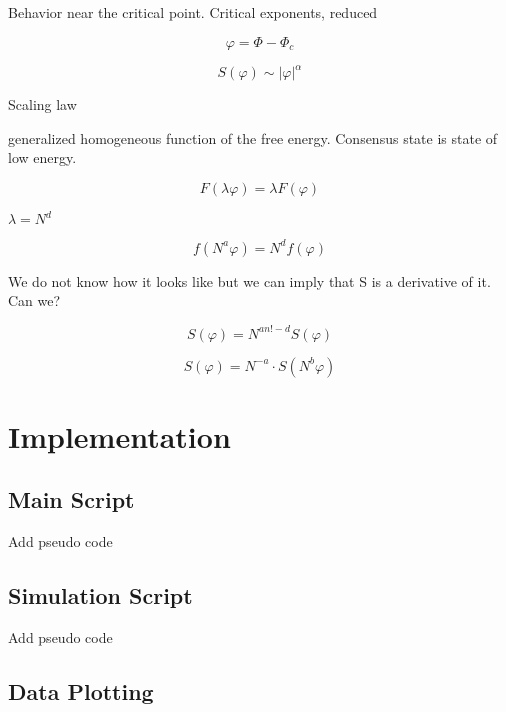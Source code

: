 \documentclass[11pt]{article}
\begin{document}
Behavior near the critical point. Critical exponents, reduced

\begin{equation}
\varphi = \Phi - \Phi_c
\end{equation}

\begin{equation}
S(\varphi) \sim  |\varphi|^\alpha
\end{equation}

Scaling law

generalized homogeneous function of the free energy. Consensus state is state of low energy.

\begin{equation}
F(\lambda \varphi) = \lambda F(\varphi)
\end{equation}

$\lambda = N^d$

\begin{equation}
f(N^a \varphi) = N^d f(\varphi)
\end{equation}

We do not know how it looks like but we can imply that S is a derivative of it. Can we?

\begin{equation}
S(\varphi) = N^{an!-d} S(\varphi)
\end{equation}

\begin{equation}
S(\varphi) = N^{-a}\cdot S(N^b  \varphi)
\end{equation}

\section{Implementation}

\subsection{Main Script}

Add pseudo code

\subsection{Simulation Script}

Add pseudo code

\subsection{Data Plotting}
\end{document}
